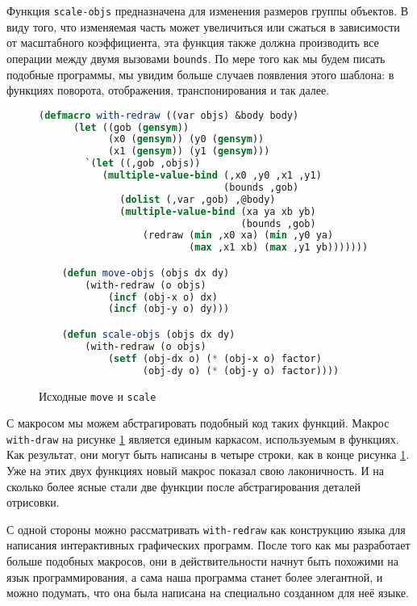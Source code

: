 \documentclass[12pt, a4paper]{article} %
\begin{document}
Функция \texttt{scale-objs} предназначена для изменения размеров группы объектов. В виду того, что изменяемая часть может увеличиться или сжаться в зависимости от масштабного коэффициента, эта функция также должна производить все операции между двумя вызовами \texttt{bounds}. По мере того как мы будем писать подобные программы, мы увидим больше случаев появления этого шаблона: в функциях поворота, отображения, транспонирования и так далее.
\begin{figure}[h]
\begin{lstlisting}[language=Lisp]
    (defmacro with-redraw ((var objs) &body body)
      (let ((gob (gensym))
            (x0 (gensym)) (y0 (gensym))
            (x1 (gensym)) (y1 (gensym)))
        `(let ((,gob ,objs))
           (multiple-value-bind (,x0 ,y0 ,x1 ,y1) 
                                (bounds ,gob)
              (dolist (,var ,gob) ,@body)
              (multiple-value-bind (xa ya xb yb) 
                                   (bounds ,gob)
                  (redraw (min ,x0 xa) (min ,y0 ya)
                          (max ,x1 xb) (max ,y1 yb)))))))

    (defun move-objs (objs dx dy)
        (with-redraw (o objs)
            (incf (obj-x o) dx)
            (incf (obj-y o) dy)))

    (defun scale-objs (objs dx dy)
        (with-redraw (o objs)
            (setf (obj-dx o) (* (obj-x o) factor)
                  (obj-dy o) (* (obj-y o) factor))))
\end{lstlisting}
\caption{Исходные \texttt{move} и \texttt{scale}}
\label{fig:8-filleted-move-scale}
\end{figure}
\clearpage\newpage
С макросом мы можем абстрагировать подобный код таких функций. Макрос \texttt{with-draw} на рисунке \ref{fig:8-filleted-move-scale} является единым каркасом, используемым в функциях. Как результат, они могут быть написаны в четыре строки, как в конце рисунка \ref{fig:8-filleted-move-scale}. Уже на этих двух функциях новый макрос показал свою лаконичность. И на сколько более ясные стали две функции после абстрагирования деталей отрисовки.

С одной стороны можно рассматривать \texttt{with-redraw} как конструкцию языка для написания интерактивных графических программ. После того как мы разработает больше подобных макросов, они в действительности начнут быть похожими на язык программирования, а сама наша программа станет более  элегантной, и можно подумать, что она была написана на специально созданном для неё языке.
\end{document}
